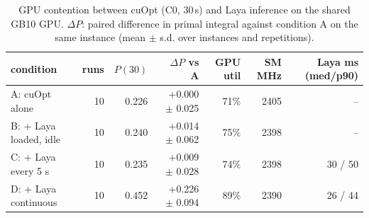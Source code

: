 \begin{table}[t]\centering\small
\begin{tabular}{lrrrrrr}
\toprule
condition & runs & $P(30)$ & $\Delta P$ vs A & GPU util & SM MHz & Laya ms (med/p90) \\
\midrule
A: cuOpt alone & 10 & 0.226 & +0.000 $\pm$ 0.025 & 71\% & 2405 & -- \\
B: + Laya loaded, idle & 10 & 0.240 & +0.014 $\pm$ 0.062 & 75\% & 2398 & -- \\
C: + Laya every 5 s & 10 & 0.235 & +0.009 $\pm$ 0.028 & 74\% & 2398 & 30 / 50 \\
D: + Laya continuous & 10 & 0.452 & +0.226 $\pm$ 0.094 & 89\% & 2390 & 26 / 44 \\
\bottomrule
\end{tabular}
\caption{GPU contention between cuOpt (C0, 30\,s) and Laya inference on the shared GB10 GPU. $\Delta P$: paired difference in primal integral against condition A on the same instance (mean $\pm$ s.d. over instances and repetitions).}\label{tab:contention}
\end{table}